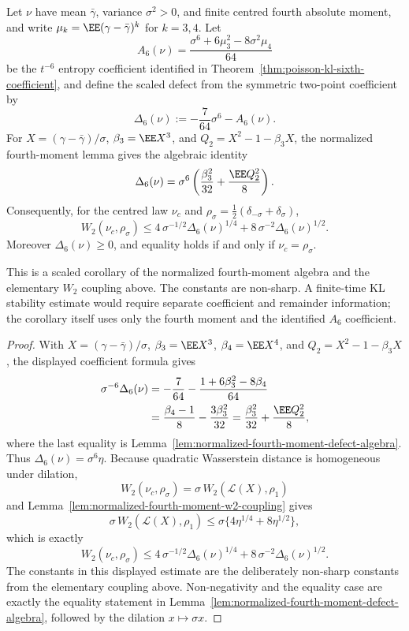 \begin{corollary}%
\label{cor:coefficient-defect-coupling}
Let \(\nu\) have mean \(\bar{\gamma}\), variance \(\sigma^2>0\), and finite
centred fourth absolute moment, and write
\(\mu_k=\EE(\gamma-\bar{\gamma})^k\) for \(k=3,4\).  Let
\[
A_6(\nu)=\frac{\sigma^6+6\mu_3^2-8\sigma^2\mu_4}{64}
\]
be the \(t^{-6}\) entropy coefficient identified in
Theorem~\ref{thm:poisson-kl-sixth-coefficient}, and define the scaled defect
from the symmetric two-point coefficient by
\begin{equation}\label{eq:coefficient-defect-normalized-algebra}
\Delta_6(\nu)
:=-\frac{7}{64}\sigma^6-A_6(\nu).
\end{equation}
For \(X=(\gamma-\bar{\gamma})/\sigma\), \(\beta_3=\EE X^3\), and
\(Q_2=X^2-1-\beta_3X\), the normalized fourth-moment lemma gives the
algebraic identity
\begin{equation}\label{eq:scaled-fourth-moment-defect}
\Delta_6(\nu)
=\sigma^6\left(
\frac{\beta_3^2}{32}+\frac{\EE Q_2^2}{8}
\right).
\end{equation}
Consequently, for the centred law \(\nu_c\) and
\(\rho_\sigma=\frac12(\delta_{-\sigma}+\delta_\sigma)\),
\[
W_2(\nu_c,\rho_\sigma)
\le
4\,\sigma^{-1/2}\Delta_6(\nu)^{1/4}
+8\,\sigma^{-2}\Delta_6(\nu)^{1/2}.
\]
Moreover \(\Delta_6(\nu)\ge0\), and equality holds if and only if
\(\nu_c=\rho_\sigma\).

This is a scaled corollary of the normalized fourth-moment algebra and the
elementary \(W_2\) coupling above.  The constants are non-sharp.  A
finite-time KL stability estimate would require separate coefficient and
remainder information; the corollary itself uses only the fourth moment and
the identified \(A_6\) coefficient.
\end{corollary}

\begin{proof}
With \(X=(\gamma-\bar{\gamma})/\sigma\), \(\beta_3=\EE X^3\),
\(\beta_4=\EE X^4\), and \(Q_2=X^2-1-\beta_3X\), the displayed coefficient
formula gives
\[
\begin{aligned}
\sigma^{-6}\Delta_6(\nu)
&=-\frac7{64}
-\frac{1+6\beta_3^2-8\beta_4}{64}  \\
&=\frac{\beta_4-1}{8}-\frac{3\beta_3^2}{32}
=\frac{\beta_3^2}{32}+\frac{\EE Q_2^2}{8},
\end{aligned}
\]
where the last equality is
Lemma~\ref{lem:normalized-fourth-moment-defect-algebra}.  Thus
\(\Delta_6(\nu)=\sigma^6\eta\).
Because quadratic Wasserstein distance is homogeneous under dilation,
\[
W_2(\nu_c,\rho_\sigma)
=\sigma\,W_2(\mathcal L(X),\rho_1)
\]
and Lemma~\ref{lem:normalized-fourth-moment-w2-coupling} gives
\[
\sigma\,W_2(\mathcal L(X),\rho_1)
\le \sigma\{4\eta^{1/4}+8\eta^{1/2}\},
\]
which is exactly
\[
W_2(\nu_c,\rho_\sigma)
\le
4\,\sigma^{-1/2}\Delta_6(\nu)^{1/4}
+8\,\sigma^{-2}\Delta_6(\nu)^{1/2}.
\]
The constants in this displayed estimate are the deliberately non-sharp
constants from the elementary coupling above.  Non-negativity and the
equality case are exactly the equality statement in
Lemma~\ref{lem:normalized-fourth-moment-defect-algebra}, followed by the
dilation \(x\mapsto\sigma x\).
\end{proof}

